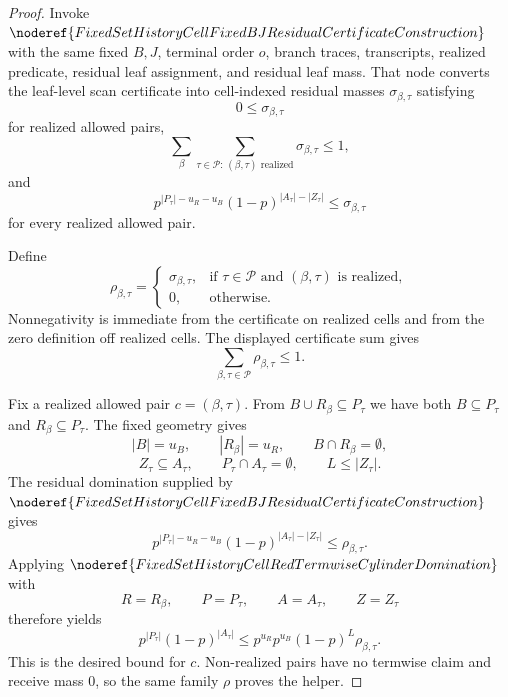 \begin{proof}
Invoke \(\noderef{FixedSetHistoryCellFixedBJResidualCertificateConstruction}\)
with the same fixed \(B,J\), terminal order \(o\), branch traces,
transcripts, realized predicate, residual leaf assignment, and residual leaf
mass.  That node converts the leaf-level scan certificate into
cell-indexed residual masses \(\sigma_{\beta,\tau}\) satisfying
\[
0\le\sigma_{\beta,\tau}
\]
for realized allowed pairs,
\[
\sum_{\beta}
  \sum_{\tau\in\mathcal P:\,(\beta,\tau)\text{ realized}}
    \sigma_{\beta,\tau}\le1,
\]
and
\[
p^{|P_\tau|-u_R-u_B}(1-p)^{|A_\tau|-|Z_\tau|}
\le \sigma_{\beta,\tau}
\]
for every realized allowed pair.

Define
\[
\rho_{\beta,\tau}=
\begin{cases}
\sigma_{\beta,\tau},&\text{if }\tau\in\mathcal P
  \text{ and }(\beta,\tau)\text{ is realized},\\
0,&\text{otherwise.}
\end{cases}
\]
Nonnegativity is immediate from the certificate on realized cells and from
the zero definition off realized cells.  The displayed certificate sum gives
\[
\sum_{\beta,\tau\in\mathcal P}\rho_{\beta,\tau}\le1.
\]

Fix a realized allowed pair \(c=(\beta,\tau)\).  From
\(B\cup R_\beta\subseteq P_\tau\) we have both \(B\subseteq P_\tau\) and
\(R_\beta\subseteq P_\tau\).  The fixed geometry gives
\[
|B|=u_B,\qquad |R_\beta|=u_R,\qquad B\cap R_\beta=\emptyset,
\]
\[
Z_\tau\subseteq A_\tau,\qquad P_\tau\cap A_\tau=\emptyset,\qquad
L\le |Z_\tau|.
\]
The residual domination supplied by
\(\noderef{FixedSetHistoryCellFixedBJResidualCertificateConstruction}\)
gives
\[
p^{|P_\tau|-u_R-u_B}(1-p)^{|A_\tau|-|Z_\tau|}
\le \rho_{\beta,\tau}.
\]
Applying \(\noderef{FixedSetHistoryCellRedTermwiseCylinderDomination}\) with
\[
R=R_\beta,\qquad P=P_\tau,\qquad A=A_\tau,\qquad Z=Z_\tau
\]
therefore yields
\[
p^{|P_\tau|}(1-p)^{|A_\tau|}
\le
p^{u_R}p^{u_B}(1-p)^L\rho_{\beta,\tau}.
\]
This is the desired bound for \(c\).  Non-realized pairs have no termwise
claim and receive mass \(0\), so the same family \(\rho\) proves the helper.
\end{proof}
